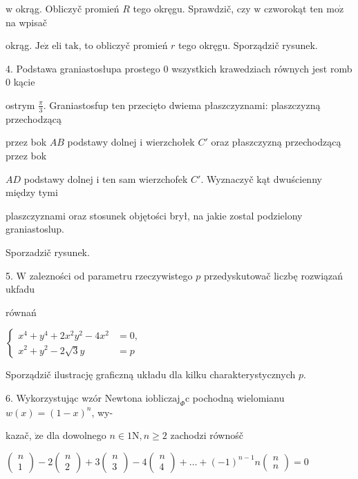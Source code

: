 \documentclass[a4paper,12pt]{article}
\begin{document}
$\mathrm{w}$ okrąg. Obliczyč promień $R$ tego okręgu. Sprawdzič, czy $\mathrm{w}$ czworokąt ten $\mathrm{m}\mathrm{o}\dot{\mathrm{z}}$ na wpisač

okrąg. $\mathrm{J}\mathrm{e}\dot{\mathrm{z}}$ eli $\mathrm{t}\mathrm{a}\mathrm{k}$, to obliczyč promień $r$ tego okręgu. Sporządzič rysunek.

4. Podstawa graniastosłupa prostego $0$ wszystkich krawedziach równych jest romb $0$ kącie

ostrym $\displaystyle \frac{\pi}{3}$. Graniastosfup ten przecięto dwiema płaszczyznami: plaszczyzną przechodzącą

przez bok $AB$ podstawy dolnej $\mathrm{i}$ wierzchołek $C'$ oraz płaszczyzną przechodzącą przez bok

$AD$ podstawy dolnej $\mathrm{i}$ ten sam wierzchofek $C'$. Wyznaczyč kąt dwuścienny między tymi

plaszczyznami oraz stosunek objętości brył, na jakie zostal podzielony graniastoslup.

Sporzadzič rysunek.

5. $\mathrm{W}$ zalezności od parametru rzeczywistego $p$ przedyskutowač liczbę rozwiązań ukfadu

równań

$\left\{\begin{array}{ll}
x^{4}+y^{4}+2x^{2}y^{2}-4x^{2} & =0,\\
x^{2}+y^{2}-2\sqrt{3}y & =p
\end{array}\right.$

Sporządzič ilustrację graficzną układu dla kilku charakterystycznych $p.$

6. Wykorzystując wzór Newtona $\mathrm{i}\mathrm{o}\mathrm{b}\mathrm{l}\mathrm{i}\mathrm{c}\mathrm{z}\mathrm{a}\mathrm{j}_{\Phi}\mathrm{c}$ pochodną wielomianu $w(x)=(1-x)^{n}$, wy-

kazač, $\dot{\mathrm{z}}\mathrm{e}$ dla dowolnego $n\in 1\mathrm{N}, n\geq 2$ zachodzi równośč

$\left(\begin{array}{l}
n\\
1
\end{array}\right)-2\left(\begin{array}{l}
n\\
2
\end{array}\right)+3\left(\begin{array}{l}
n\\
3
\end{array}\right)-4\left(\begin{array}{l}
n\\
4
\end{array}\right)+\ldots+(-1)^{n-1}n\left(\begin{array}{l}
n\\
n
\end{array}\right)=0$
\end{document}
